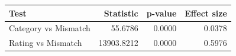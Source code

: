 \begin{tabular}{lrrr}
\toprule
Test & Statistic & p-value & Effect size \\
\midrule
Category vs Mismatch & 55.6786 & 0.0000 & 0.0378 \\
Rating vs Mismatch & 13903.8212 & 0.0000 & 0.5976 \\
\bottomrule
\end{tabular}
